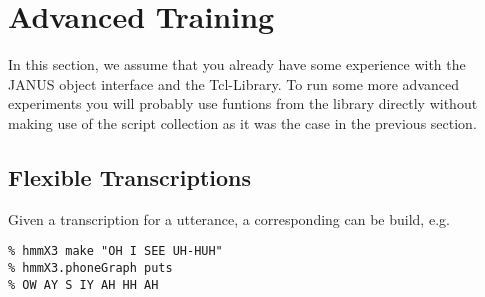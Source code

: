 
\section{Advanced Training} \label{janus:advanced}

In this section, we assume that you  already have some experience with
the JANUS  object interface  and the   Tcl-Library. To run   some more
advanced  experiments you will probably  use funtions from the library
directly without making  use of the  script collection  as it  was the
case in the previous section.

\subsection{Flexible Transcriptions}

Given a transcription for a utterance, a corresponding  can be build, e.g.

\begin{verbatim}
% hmmX3 make "OH I SEE UH-HUH"
% hmmX3.phoneGraph puts
% OW AY S IY AH HH AH
\end{verbatim}


